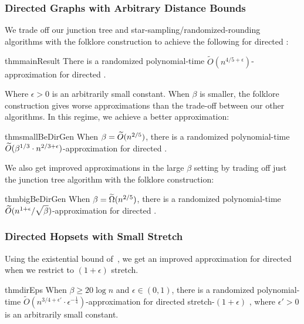 \subsubsection{Directed Graphs with Arbitrary Distance Bounds}
We trade off our junction tree and star-sampling/randomized-rounding algorithms with the folklore construction to achieve the following for directed {\hopset}:
\begin{restatable}{thm}{mainResult}
\label{thm:main_result}
    There is a randomized  polynomial-time $\widetilde{O}(n^{4/5 + \epsilon})$-approximation for directed {\hopset}.
\end{restatable}

Where $\epsilon > 0$ is an arbitrarily small constant. When $\beta$ is smaller, the folklore construction gives worse approximations than the trade-off between our other algorithms. In this regime, we achieve a better approximation:
\begin{restatable}{thm}{smallBeDirGen} \label{thm:small_be_dir_gen}
    When $\beta = \widetilde{O}(n^{2/5})$, there is a randomized polynomial-time $\widetilde{O}(\beta^{1/3} \cdot n^{2/3 + \epsilon})$-approximation for directed {\hopset}.
\end{restatable}
 
We also get improved approximations in the large $\beta$ setting by trading off just the junction tree algorithm with the folklore construction:
\begin{restatable}{thm}{bigBeDirGen} \label{thm:big_be_dir_gen}
    When $\beta = \widetilde{\Omega}(n^{2/5})$, there is a randomized polynomial-time $\widetilde{O}( n^{1+\epsilon} / \sqrt{\vphantom{\be^k} \be})$-approximation for directed {\hopset}.
\end{restatable}


\subsubsection{Directed Hopsets with Small Stretch}
Using the existential bound of~\cite{BW23}, we get an improved approximation for directed {\hopset} when we restrict to $(1+\epsilon)$ stretch. 
\begin{restatable}{thm}{dirEps} \label{thm:dir_eps}
    When $\beta \geq 20\log n$ and $\epsilon \in (0,1)$, there is a randomized polynomial-time $\widetilde{O}(n^{3/4 + \epsilon'} \cdot \epsilon^{-\frac{1}{4}})$-approximation for directed stretch-$(1+\epsilon)$ {\hopset}, where $\epsilon' > 0$ is an arbitrarily small constant.
\end{restatable}


